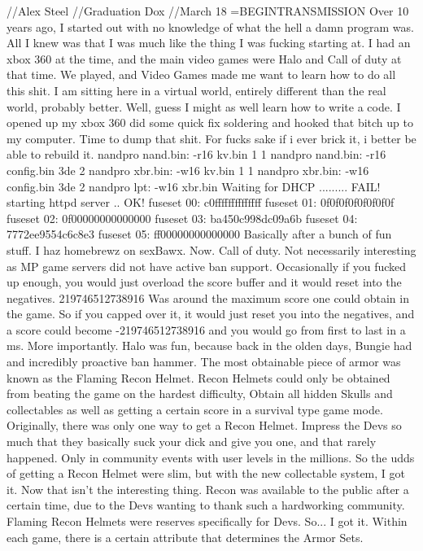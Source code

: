 //Alex Steel
//Graduation Dox
//March 18
=BEGINTRANSMISSION
Over 10 years ago, I started out with no knowledge of what the hell a damn program was.
All I knew was that I was much like the thing I was fucking starting at.
I had an xbox 360 at the time, and the main video games were Halo and Call of duty at that time.
We played, and Video Games made me want to learn how to do all this shit.
I am sitting here in a virtual world, entirely different than the real world, probably better.
Well, guess I might as well learn how to write a code.
I opened up my xbox 360 did some quick fix soldering and hooked that bitch up to my computer.
Time to dump that shit. For fucks sake if i ever brick it, i better be able to rebuild it.
nandpro nand.bin: -r16 kv.bin 1 1
nandpro nand.bin: -r16 config.bin 3de 2
nandpro xbr.bin: -w16 kv.bin 1 1
nandpro xbr.bin: -w16 config.bin 3de 2
nandpro lpt: -w16 xbr.bin
Waiting for DHCP ......... FAIL!
starting httpd server .. OK!
fuseset 00: c0ffffffffffffff
fuseset 01: 0f0f0f0f0f0f0f0f
fuseset 02: 0f00000000000000
fuseset 03: ba450c998dc09a6b
fuseset 04: 7772ee9554c6c8e3
fuseset 05: ff00000000000000
Basically after a bunch of fun stuff. I haz homebrewz on sexBawx.
Now. Call of duty. Not necessarily interesting as MP game servers 
did not have active ban support. Occasionally if you fucked up enough, 
you would just overload the score buffer and it would reset into the negatives.
219746512738916 Was around the maximum score one could obtain in the game.
So if you capped over it, it would just reset you into the negatives, and a score
could become -219746512738916 and you would go from first to last in a ms.
More importantly. Halo was fun, because back in the olden days, Bungie had
and incredibly proactive ban hammer. The most obtainable piece of armor
was known as the Flaming Recon Helmet. Recon Helmets could only be obtained
from beating the game on the hardest difficulty, Obtain all hidden Skulls and collectables
as well as getting a certain score in a survival type game mode. Originally, there was only
one way to get a Recon Helmet. Impress the Devs so much that they basically suck your dick
and give you one, and that rarely happened. Only in community events with user levels in the millions.
So the udds of getting a Recon Helmet were slim, but with the new collectable system, I got it.
Now that isn't the interesting thing. Recon was available to the public after a certain time,
due to the Devs wanting to thank such a hardworking community. Flaming Recon Helmets were
reserves specifically for Devs. So... I got it.
Within each game, there is a certain attribute that determines the Armor Sets.
